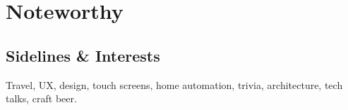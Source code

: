 \documentclass[]{cvpn}
\begin{document}
\begin{multicols}{2}
\begin{eventlist}
\end{eventlist}

\section{Noteworthy}




\subsection{Sidelines \& Interests}
Travel, UX, design, touch screens, home automation,
trivia, architecture, tech talks, craft beer.

\end{multicols}
\end{document}
